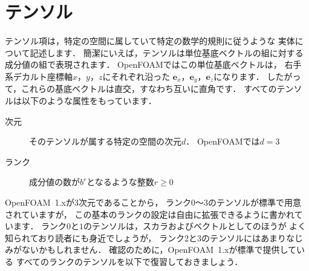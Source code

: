 \section{テンソル}
\label{sec:1.2}
テンソル項は，特定の空間に属していて特定の数学的規則に従うような
実体について記述します．
簡潔にいえば，テンソルは単位基底ベクトルの組に対する
成分値の組で表現されます．
OpenFOAMではこの単位基底ベクトルは，
右手系デカルト座標軸$x$，$y$，$z$にそれぞれ沿った
$\mathbf{e}_{x}$，$\mathbf{e}_{y}$，$\mathbf{e}_{z}$になります．
したがって，これらの基底ベクトルは直交，すなわち互いに直角です．
すべてのテンソルは以下のような属性をもっています．
\begin{description}
 \item[次元] そのテンソルが属する特定の空間の次元$d$．
            OpenFOAMでは$d = 3$
 \item[ランク] 成分値の数が$b^{r}$となるような整数$r \ge 0$
\end{description}
OpenFOAM~1.xが3次元であることから，
ランク$0$〜$3$のテンソルが標準で用意されていますが，
この基本のランクの設定は自由に拡張できるように書かれています．
ランク$0$と$1$のテンソルは，スカラおよびベクトルとしてのほうが
よく知られており読者にも身近でしょうが，
ランク$2$と$3$のテンソルにはあまりなじみがないかもしれません．
確認のために，OpenFOAM~1.xが標準で提供している
すべてのランクのテンソルを以下で復習しておきましょう．
